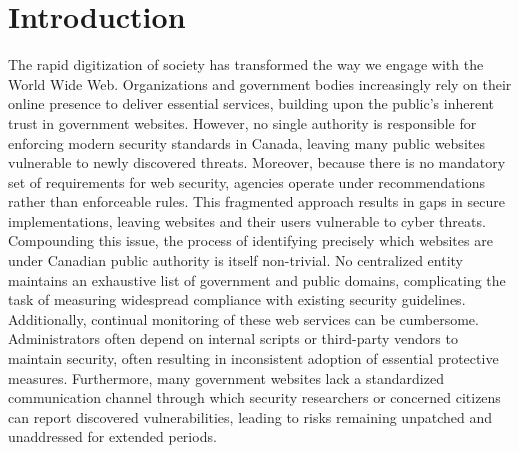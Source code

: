 \documentclass[pdflatex,sn-mathphys-num]{sn-jnl}
\numberwithin{equation}{section}
\theoremstyle{thmstyleone}
\theoremstyle{thmstyletwo}%
\theoremstyle{thmstylethree}%
\begin{document}
\section{Introduction}\label{sec:intro}





\vspace{1em}The rapid digitization of society has transformed the way we engage with the 
World Wide Web. Organizations and government bodies increasingly rely on their online 
presence to deliver essential services, building upon the public’s inherent trust in government 
websites. However, no single authority is responsible for enforcing modern security standards in 
Canada, leaving many public websites vulnerable to newly discovered threats. Moreover, because 
there is no mandatory set of requirements for web security, agencies operate under recommendations 
rather than enforceable rules. This fragmented approach results in gaps in secure implementations, 
leaving websites and their users vulnerable to cyber threats. Compounding this issue, the process 
of identifying precisely which websites are under Canadian public authority is itself non-trivial. 
No centralized entity maintains an exhaustive list of government and public domains, 
complicating the task of 
measuring widespread compliance with existing security guidelines. Additionally, continual 
monitoring of these web services can be cumbersome. Administrators often depend on internal 
scripts or third-party vendors to maintain security, often resulting in inconsistent adoption of 
essential protective measures. Furthermore, many government websites lack a standardized 
communication channel through which security researchers or concerned citizens can report discovered 
vulnerabilities, leading to risks remaining unpatched and unaddressed for extended periods. 
\end{document}
